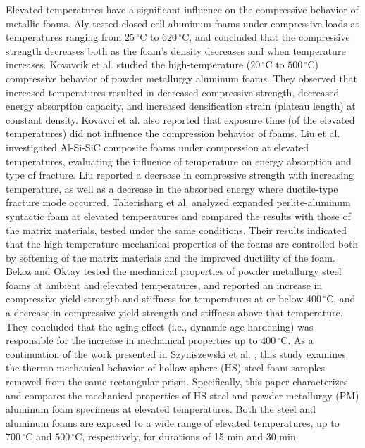 \documentclass[review]{elsarticle}
\begin{document}
Elevated temperatures have a significant influence on the compressive behavior of metallic foams. Aly \cite{Aly2007} tested closed cell aluminum foams under compressive loads at temperatures ranging from $25\,^{\circ}\mathrm{C}$ to $620\,^{\circ}\mathrm{C}$, and concluded that the compressive strength decreases both as the foam's density decreases and when temperature increases. Kovavcik et al. \cite{Kovacicetal2016} studied the high-temperature ($20\,^{\circ}\mathrm{C}$ to $500\,^{\circ}\mathrm{C}$) compressive behavior of powder metallurgy aluminum foams. They observed that increased temperatures resulted in decreased compressive strength, decreased energy absorption capacity, and increased densification strain (plateau length) at constant density. Kovavci et al. \cite{Kovacicetal2016} also reported that exposure time (of the elevated temperatures) did not influence the compression behavior of foams. Liu et al. \cite{Liuetal2016} investigated Al-Si-SiC composite foams under compression at elevated temperatures, evaluating the influence of temperature on energy absorption and type of fracture. Liu \cite{Liuetal2016} reported a decrease in compressive strength with increasing temperature, as well as a decrease in the absorbed energy where ductile-type fracture mode occurred. Taherisharg et al. \cite{Taherishargh2018} analyzed expanded perlite-aluminum syntactic foam at elevated temperatures and compared the results with those of the matrix materials, tested under the same conditions. Their results indicated that the high-temperature mechanical properties of the foams are controlled both by softening of the matrix materials and the improved ductility of the foam. Bekoz and Oktay \cite{BekozOktay2014} tested the mechanical properties of powder metallurgy steel foams at ambient and elevated temperatures, and reported an increase in compressive yield strength and stiffness for temperatures at or below $400\,^{\circ}\mathrm{C}$, and a decrease in compressive yield strength and stiffness above that temperature. They \cite{BekozOktay2014} concluded that the aging effect (i.e., dynamic age-hardening) was responsible for the increase in mechanical properties up to $400\,^{\circ}\mathrm{C}$. As a continuation of the work presented in Szyniszewski et al. \cite{Szyniszewskietal2014}, this study examines the thermo-mechanical behavior of hollow-sphere (HS) steel foam samples removed from the same rectangular prism. Specifically, this paper characterizes and compares the mechanical properties of HS steel and powder-metallurgy (PM) aluminum foam specimens at elevated temperatures. Both the steel and aluminum foams are exposed to a wide range of elevated temperatures, up to $700\,^{\circ}\mathrm{C}$
and $500\,^{\circ}\mathrm{C}$, respectively, for durations of 15 min and 30 min. 
\end{document}
